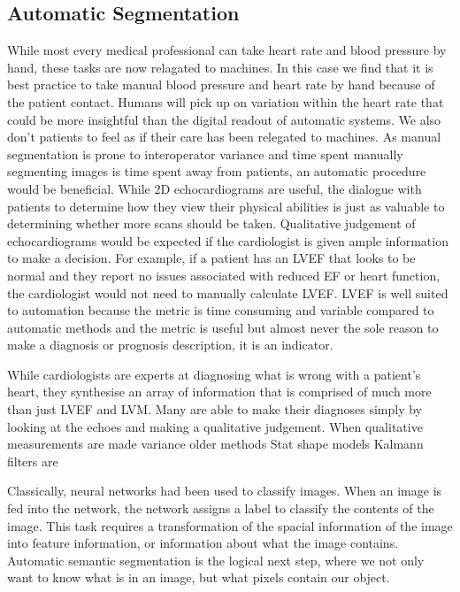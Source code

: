 \documentclass[12pt]{article}
\begin{document}
\subsection{Automatic Segmentation}
While most every medical professional can take heart rate and blood pressure by hand, these tasks are now relagated to machines.\cite{pulse oxymmetry bp cuffs}
In this case we find that it is best practice to take manual blood pressure and heart rate by hand because of the patient contact\cite{obs_guidelines}.
Humans will pick up on variation within the heart rate that could be more insightful than the digital readout of automatic systems.
We also don't patients to feel as if their care has been relegated to machines.
As manual segmentation is prone to interoperator variance\cite{jacc_ef_p_and_c} and time spent manually segmenting images is time spent away from patients, an automatic procedure would be beneficial.
While 2D echocardiograms are useful, the dialogue with patients to determine how they view their physical abilities is just as valuable to determining whether more scans should be taken.
Qualitative judgement of echocardiograms would be expected if the cardiologist is given ample information to make a decision.
For example, if a patient has an LVEF that looks to be normal and they report no issues associated with reduced EF or heart function, the cardiologist would not need to manually calculate LVEF.
LVEF is well suited to automation because the metric is time consuming and variable compared to automatic methods and the metric is useful but almost never the sole reason to make a diagnosis or prognosis description, it is an indicator.

While cardiologists are experts at diagnosing what is wrong with a patient's heart, they synthesise an array of information that is comprised of much more than just LVEF and LVM.
Many are able to make their diagnoses simply by looking at the echoes and making a qualitative judgement.
When qualitative measurements are made
variance
older methods
Stat shape models
Kalmann filters are

Classically, neural networks had been used to classify images.
When an image is fed into the network, the network assigns a label to classify the contents of the image.
This task requires a transformation of the spacial information of the image into feature information, or information about what the image contains. 
Automatic semantic segmentation is the logical next step, where we not only want to know what is in an image, but what pixels contain our object.
\end{document}
